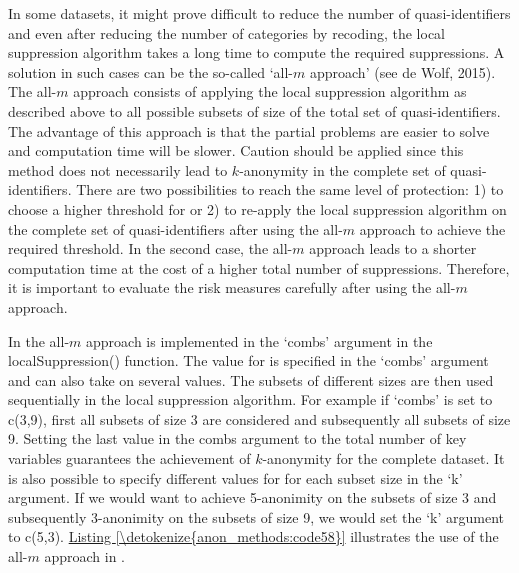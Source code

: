 \documentclass[letterpaper,10pt,english]{sphinxmanual}
\begin{document}
In some datasets, it might prove difficult to reduce the number of
quasi-identifiers and even after reducing the number of categories by
recoding, the local suppression algorithm takes a long time to compute
the required suppressions. A solution in such cases can be the so-called
‘all-\(m\) approach’ (see de Wolf, 2015). The all-\(m\)
approach consists of applying the local suppression algorithm as
described above to all possible subsets of size  of the total set of
quasi-identifiers. The advantage of this approach is that the partial
problems are easier to solve and computation time will be slower.
Caution should be applied since this method does not necessarily lead to
\(k\)-anonymity in the complete set of quasi-identifiers. There are
two possibilities to reach the same level of protection: 1) to choose a
higher threshold for  or 2) to re-apply the local suppression
algorithm on the complete set of quasi-identifiers after using the
all-\(m\) approach to achieve the required threshold. In the
second case, the all-\(m\) approach leads to a shorter computation
time at the cost of a higher total number of suppressions.  Therefore, it is
important to evaluate the risk measures carefully after using the
all-\(m\) approach.

In  the all-\(m\) approach is implemented in the ‘combs’
argument in the localSuppression() function. The value for  is
specified in the ‘combs’ argument and can also take on several values.
The subsets of different sizes are then used sequentially in the local
suppression algorithm. For example if ‘combs’ is set to c(3,9), first
all subsets of size 3 are considered and subsequently all subsets of
size 9. Setting the last value in the combs argument to the total number
of key variables guarantees the achievement of \(k\)-anonymity for
the complete dataset. It is also possible to specify different values
for  for each subset size in the ‘k’ argument. If we would want to
achieve 5-anonimity on the subsets of size 3 and subsequently
3-anonimity on the subsets of size 9, we would set the ‘k’ argument to
c(5,3). \hyperref[\detokenize{anon_methods:code58}]{Listing \ref{\detokenize{anon_methods:code58}}} illustrates the use of the all-\(m\) approach
in .
\end{document}

